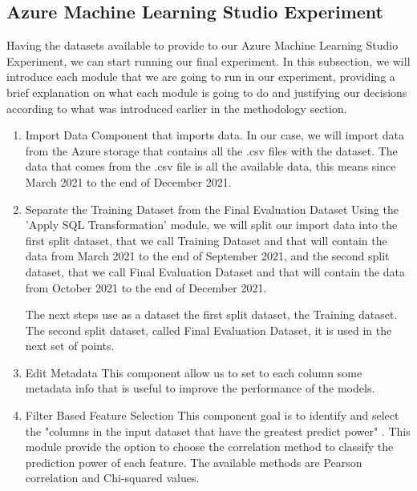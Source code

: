 
\subsection{Azure Machine Learning Studio Experiment}
Having the datasets available to provide to our Azure Machine Learning Studio Experiment, we can start running our final experiment.
In this subsection, we will introduce each module that we are going to run in our experiment, providing a brief explanation on what each module is going to do and justifying our decisions according to what was introduced earlier in the methodology section.

\begin{enumerate}
    \item{Import Data}
Component that imports data. In our case, we will import data from the Azure storage that contains all the .csv files with the dataset. The data that comes from the .csv file is all the available data, this means since March 2021 to the end of December 2021.

    \item{Separate the Training Dataset from the Final Evaluation Dataset}
Using the 'Apply SQL Transformation' module, we will split our import data into the first split dataset, that we call Training Dataset and that will contain the data from March 2021 to the end of September 2021, and the second split dataset, that we call Final Evaluation Dataset and that will contain the data from October 2021 to the end of December 2021.

The next steps use as a dataset the first split dataset, the Training dataset. The second split dataset, called Final Evaluation Dataset, it is used in the next set of points.
    
    \item{Edit Metadata}
This component allow us to set to each column some metadata info that is useful to improve the performance of the models.
    
    \item{Filter Based Feature Selection}
This component goal is to identify and select the "columns in the input dataset that have the greatest predict power" \cite{AZURE_MACHINE_LEARNING}. This module provide the option to choose the correlation method to classify the prediction power of each feature. The available methods are Pearson correlation and Chi-squared values.


\end{enumerate}
